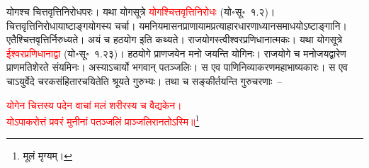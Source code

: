 \begin{sloppypar}\justifying\noindent\hspace{10mm} योगश्च चित्त\-वृत्ति\-निरोधपरः। यथा योगसूत्रे \textcolor{red}{योगश्चित्तवृत्तिनिरोधः} (यो॰सू॰~१.२)। चित्त\-वृत्ति\-निरोधायाष्टाङ्गयोगस्य चर्चा। यम\-नियमासन\-प्राणायाम\-प्रत्याहार\-धारणा\-ध्यान\-समाधयोऽष्टाङ्गानि। एतैश्चित्तवृत्तिर्निरुध्यते। अयं च हठयोग इति कथ्यते। राजयोगस्त्वीश्वर\-प्रणिधानात्मकः। यथा योग\-सूत्रे \textcolor{red}{ईश्वरप्रणिधानाद्वा} (यो॰सू॰~१.२३)। हठ\-योगे प्राण\-जयेन मनो जयन्ति योगिनः। राजयोगे च मनोजय\-द्वारेण प्राणमतिशेरते संयमिनः। अस्याऽचार्यो भगवान् पतञ्जलिः। स एव पाणिनि\-व्याकरण\-महाभाष्यकारः। स एव चाऽयुर्वेदे चरक\-संहिता\-रचयितेति श्रूयते गुरुभ्यः। तथा च सङ्कीर्तयन्ति गुरुचरणाः~–\end{sloppypar}
\centering\textcolor{red}{योगेन चित्तस्य पदेन वाचां मलं शरीरस्य च वैद्यकेन।\nopagebreak\\
योऽपाकरोत्तं प्रवरं मुनीनां पतञ्जलिं प्राञ्जलिरानतोऽस्मि॥}\footnote{मूलं मृग्यम्।}\\
